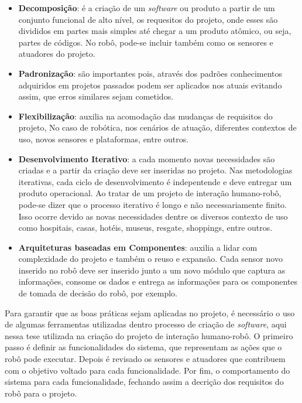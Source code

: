 \begin{itemize}
	\item \textbf{Decomposição}: é a criação de um \emph{software} ou produto a partir de um conjunto funcional de alto nível, os requesitos do projeto, onde esses são divididos em partes mais simples até chegar a um produto atômico, ou seja, partes de códigos. No robô, pode-se incluir também como os sensores e atuadores do projeto.
	\item \textbf{Padronização}: são importantes pois, através dos padrões conhecimentos adquiridos em projetos passados podem ser aplicados nos atuais evitando assim, que erros similares sejam cometidos.
	\item \textbf{Flexibilização}: auxilia na acomodação das mudanças de requisitos do projeto, No caso de robótica, nos cenários de atuação, diferentes contextos de uso, novos sensores e plataformas, entre outros.
	\item \textbf{Desenvolvimento Iterativo}: a cada momento novas necessidades são criadas e a partir da criação deve ser inseridas no projeto. Nas metodologias iterativas, cada ciclo de desenvolvimento é indepentende e deve entregar um produto operacional. Ao tratar de um projeto de interação humano-robô, pode-se dizer que o processo iterativo é longo e não necessariamente finito. Isso ocorre devido as novas necessidades dentre os diversos contexto de uso como hospitais, casas, hotéis, museus, resgate, shoppings, entre outros.
	\item \textbf{Arquiteturas baseadas em Componentes}: auxilia a lidar com complexidade do projeto e também o reuso e expansão. Cada sensor novo inserido no robô deve ser inserido junto a um novo módulo que captura as informações, consome os dados e entrega as informações para os componentes de tomada de decisão do robô, por exemplo.
\end{itemize}

Para garantir que as boas práticas sejam aplicadas no projeto, é necessário o uso de algumas ferramentas utilizadas dentro processo de criação de \emph{software}, aqui nessa tese utilizada na criação do projeto de interação humano-robô. O primeiro passo é definir as funcionalidades do sistema, que representam as ações que o robô pode executar. Depois é revisado os sensores e atuadores que contribuem com o objetivo voltado para cada funcionalidade. Por fim, o comportamento do sistema para cada funcionalidade, fechando assim a decrição dos requisitos do robô para o projeto.

